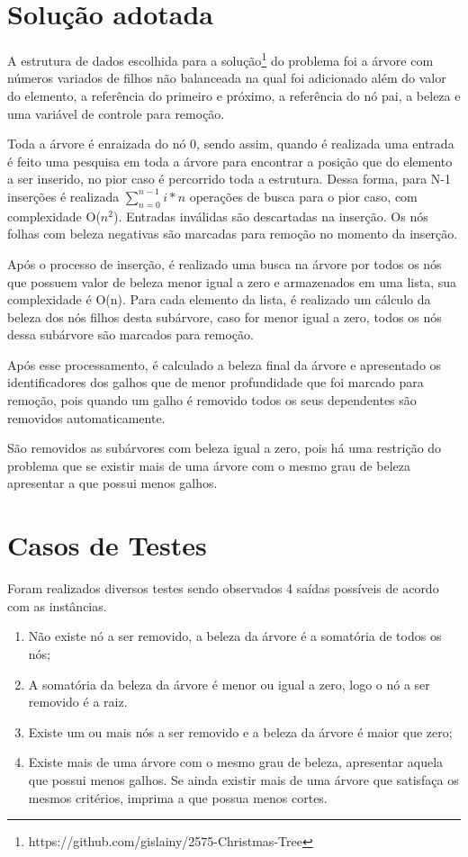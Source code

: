 \documentclass[12pt]{article}
\begin{document}
\section{Solução adotada}\label{sec:solucao}

A estrutura de dados escolhida para a solução\footnote{https://github.com/gislainy/2575-Christmas-Tree} do problema foi a árvore com números variados de filhos não balanceada na qual foi adicionado além do valor do elemento, a referência do primeiro e próximo, a referência do nó pai, a beleza e uma variável de controle para remoção.

Toda a árvore é enraizada do nó 0, sendo assim, quando é realizada uma entrada é feito uma pesquisa em toda a árvore para encontrar a posição que do elemento a ser inserido, no pior caso é percorrido toda a estrutura. Dessa forma, para N-1 inserções é realizada $\sum_{n=0}^{n-1} i*n$ operações de busca para o pior caso, com complexidade O(${n^2}$). Entradas inválidas são descartadas na inserção. Os  nós folhas com beleza negativas são marcadas para remoção no momento da inserção.


Após o processo de inserção, é realizado uma busca na árvore por todos os nós que possuem valor de beleza menor igual a zero e armazenados em uma lista, sua complexidade é O(n). Para cada elemento da lista, é realizado um cálculo da beleza dos nós filhos desta subárvore, caso for menor igual a zero, todos os nós dessa subárvore são marcados para remoção. 

Após esse processamento, é calculado a beleza final da árvore e apresentado os identificadores dos galhos que de menor profundidade que foi marcado para remoção, pois quando um galho é removido todos os seus dependentes são removidos automaticamente. 

São removidos as subárvores com beleza igual a zero, pois há uma restrição do problema que se existir mais de uma árvore com o mesmo grau de beleza apresentar a que possui menos galhos. 

\section{Casos de Testes}\label{sec:casosdeteste}
Foram realizados diversos testes sendo observados 4 saídas possíveis de acordo com as instâncias.
\begin{enumerate}
    \item Não existe nó a ser removido, a beleza da árvore é a somatória de todos os nós;
    \item A somatória da beleza da árvore é menor ou igual a zero, logo o nó a ser removido é a raiz.
    \item Existe um ou mais nós a ser removido e a beleza da árvore é maior que zero;
    \item Existe mais de uma árvore com o mesmo grau de beleza, apresentar aquela que possui menos galhos. Se ainda existir mais de uma árvore que satisfaça os mesmos critérios, imprima a que possua menos cortes.
\end{enumerate}
\end{document}
